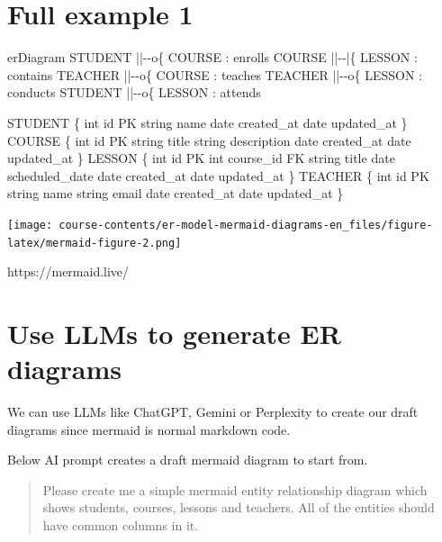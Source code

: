 \documentclass[
  letterpaper,
  DIV=11,
  numbers=noendperiod]{scrreprt}
\newenvironment{Shaded}{\begin{snugshade}}{\end{snugshade}}
\newcommand{\NormalTok}[1]{\textcolor[rgb]{0.00,0.23,0.31}{#1}}
\begin{document}
\section{Full example 1}\label{full-example-1}

\begin{Shaded}
\begin{Highlighting}[]
\NormalTok{erDiagram}
\NormalTok{    STUDENT ||{-}{-}o\{ COURSE : enrolls}
\NormalTok{    COURSE ||{-}{-}|\{ LESSON : contains}
\NormalTok{    TEACHER ||{-}{-}o\{ COURSE : teaches}
\NormalTok{    TEACHER ||{-}{-}o\{ LESSON : conducts}
\NormalTok{    STUDENT ||{-}{-}o\{ LESSON : attends}


\NormalTok{    STUDENT \{}
\NormalTok{        int id PK}
\NormalTok{        string name}
\NormalTok{        date created\_at}
\NormalTok{        date updated\_at}
\NormalTok{    \}}
\NormalTok{    COURSE \{}
\NormalTok{        int id PK}
\NormalTok{        string title}
\NormalTok{        string description}
\NormalTok{        date created\_at}
\NormalTok{        date updated\_at}
\NormalTok{    \}}
\NormalTok{    LESSON \{}
\NormalTok{        int id PK}
\NormalTok{        int course\_id FK}
\NormalTok{        string title}
\NormalTok{        date scheduled\_date}
\NormalTok{        date created\_at}
\NormalTok{        date updated\_at}
\NormalTok{    \}}
\NormalTok{    TEACHER \{}
\NormalTok{        int id PK}
\NormalTok{        string name}
\NormalTok{        string email}
\NormalTok{        date created\_at}
\NormalTok{        date updated\_at}
\NormalTok{    \}}
\end{Highlighting}
\end{Shaded}

\texttt{[image: course-contents/er-model-mermaid-diagrams-en\_files/figure-latex/mermaid-figure-2.png]}

https://mermaid.live/

\section{Use LLMs to generate ER
diagrams}\label{use-llms-to-generate-er-diagrams}

We can use LLMs like ChatGPT, Gemini or Perplexity to create our draft
diagrams since mermaid is normal markdown code.

Below AI prompt creates a draft mermaid diagram to start from.

\begin{quote}
Please create me a simple mermaid entity relationship diagram which
shows students, courses, lessons and teachers. All of the entities
should have common columns in it.
\end{quote}
\end{document}
